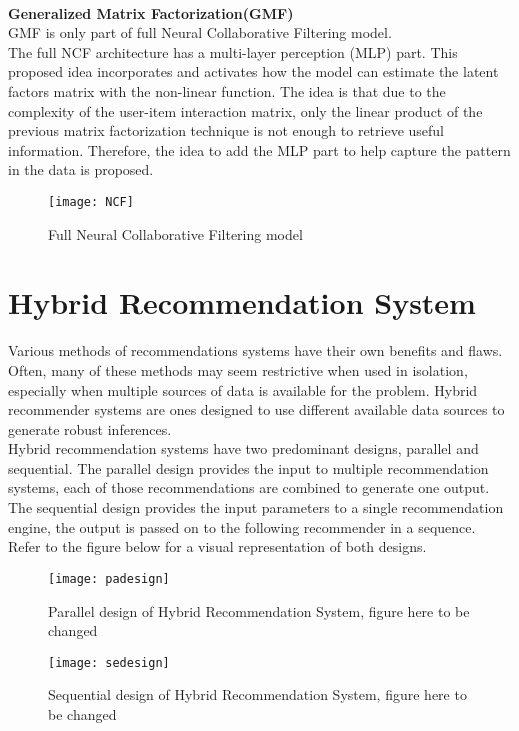 \\\textbf{Generalized Matrix Factorization(GMF)}
 \\GMF is only part of full Neural Collaborative Filtering model.
 \\The full NCF architecture has a multi-layer perception (MLP) part. This proposed idea incorporates and activates how the model can estimate the latent factors matrix with the non-linear function. The idea is that due to the complexity of the user-item interaction matrix, only the linear product of the previous matrix factorization technique is not enough to retrieve useful information. Therefore, the idea to add the MLP part to help capture the pattern in the data is proposed.
 \begin{figure}[ht]
\centering
\texttt{[image: NCF]}
\caption{Full Neural Collaborative Filtering model}
\end{figure}
 

\section{Hybrid Recommendation System}
Various methods of recommendations systems have their own benefits and flaws. Often, many of these methods may seem restrictive when used in isolation, especially when multiple sources of data is available for the problem. Hybrid recommender systems are ones designed to use different available data sources to generate robust inferences.
\\Hybrid recommendation systems have two predominant designs, parallel and sequential. The parallel design provides the input to multiple recommendation systems, each of those recommendations are combined to generate one output. The sequential design provides the input parameters to a single recommendation engine, the output is passed on to the following recommender in a sequence. Refer to the figure below for a visual representation of both designs.
\begin{figure}[ht]
\centering
\texttt{[image: padesign]}
\caption{Parallel design of Hybrid Recommendation System, figure here to be changed}
\centering
\end{figure}
\begin{figure}[ht]
\centering
\texttt{[image: sedesign]}
\caption{Sequential design of Hybrid Recommendation System, figure here to be changed}
\centering
\end{figure}

